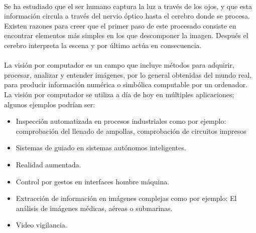 \documentclass[a4paper,12pt,titlepage,final]{book}
\begin{document}
\paragraph{}
Se ha estudiado que el ser humano captura la luz a través de los ojos, y que
esta información circula a través del nervio óptico hasta el cerebro donde se
procesa. Existen razones para creer que el primer paso de este procesado
consiste en encontrar elementos más simples en los que descomponer la imagen.
Después el cerebro interpreta la escena y por último actúa en consecuencia.

\paragraph{}
La visión por computador es un campo que incluye métodos para adquirir,
procesar, analizar y entender imágenes, por lo general obtenidas del mundo real,
para producir información numérica o simbólica computable por un ordenador. La
visión por computador se utiliza a día de hoy en múltiples aplicaciones; algunos
ejemplos podrían ser:

\begin{itemize}
  \item Inspección automatizada en procesos industriales como por ejemplo:
  comprobación del llenado de ampollas, comprobación de circuitos impresos
  \item Sistemas de guiado en sistemas autónomos inteligentes.
  \item Realidad aumentada.
  \item Control por gestos en interfaces hombre máquina.
  \item Extracción de información en imágenes complejas como por ejemplo: El
  análisis de imágenes médicas, aéreas o submarinas.
  \item Video vigilancia.
\end{itemize}
\end{document}
